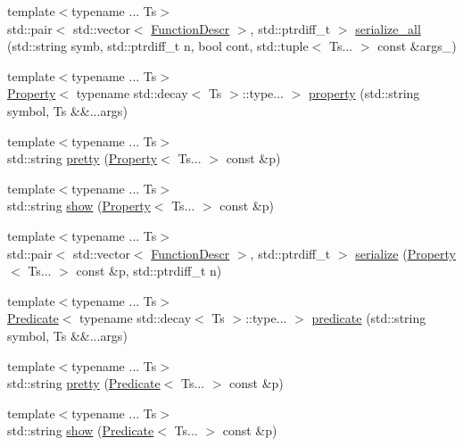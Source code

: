 \begin{DoxyCompactItemize}
\item 
{\footnotesize template$<$typename ... Ts$>$ }\\std\+::pair$<$ std\+::vector$<$ \hyperlink{structpfq_1_1lang_1_1FunctionDescr}{Function\+Descr} $>$, std\+::ptrdiff\+\_\+t $>$ \hyperlink{namespacepfq_1_1lang_acd7f9c34960d4f3511228a5568628acf}{serialize\+\_\+all} (std\+::string symb, std\+::ptrdiff\+\_\+t n, bool cont, std\+::tuple$<$ Ts... $>$ const \&args\+\_\+)
\item 
{\footnotesize template$<$typename ... Ts$>$ }\\\hyperlink{structpfq_1_1lang_1_1Property}{Property}$<$ typename std\+::decay$<$ Ts $>$\+::type... $>$ \hyperlink{namespacepfq_1_1lang_a1249450e72229273b0db707a286aea91}{property} (std\+::string symbol, Ts \&\&...args)
\item 
{\footnotesize template$<$typename ... Ts$>$ }\\std\+::string \hyperlink{namespacepfq_1_1lang_ad72cdee2fca49246a75620232dfe061a}{pretty} (\hyperlink{structpfq_1_1lang_1_1Property}{Property}$<$ Ts... $>$ const \&p)
\item 
{\footnotesize template$<$typename ... Ts$>$ }\\std\+::string \hyperlink{namespacepfq_1_1lang_a94bf1496c888adfd3d99e25895ed6df8}{show} (\hyperlink{structpfq_1_1lang_1_1Property}{Property}$<$ Ts... $>$ const \&p)
\item 
{\footnotesize template$<$typename ... Ts$>$ }\\std\+::pair$<$ std\+::vector$<$ \hyperlink{structpfq_1_1lang_1_1FunctionDescr}{Function\+Descr} $>$, std\+::ptrdiff\+\_\+t $>$ \hyperlink{namespacepfq_1_1lang_ac9dfedf649f03709f23fc7ca4afc1679}{serialize} (\hyperlink{structpfq_1_1lang_1_1Property}{Property}$<$ Ts... $>$ const \&p, std\+::ptrdiff\+\_\+t n)
\item 
{\footnotesize template$<$typename ... Ts$>$ }\\\hyperlink{structpfq_1_1lang_1_1Predicate}{Predicate}$<$ typename std\+::decay$<$ Ts $>$\+::type... $>$ \hyperlink{namespacepfq_1_1lang_aca9adafc436b7f851621b979fa1aaf88}{predicate} (std\+::string symbol, Ts \&\&...args)
\item 
{\footnotesize template$<$typename ... Ts$>$ }\\std\+::string \hyperlink{namespacepfq_1_1lang_a365497365bebd1ef44492e8027a6b3c0}{pretty} (\hyperlink{structpfq_1_1lang_1_1Predicate}{Predicate}$<$ Ts... $>$ const \&p)
\item 
{\footnotesize template$<$typename ... Ts$>$ }\\std\+::string \hyperlink{namespacepfq_1_1lang_a42c749f45910e4c14d412cc3db5791e5}{show} (\hyperlink{structpfq_1_1lang_1_1Predicate}{Predicate}$<$ Ts... $>$ const \&p)

\end{DoxyCompactItemize}
